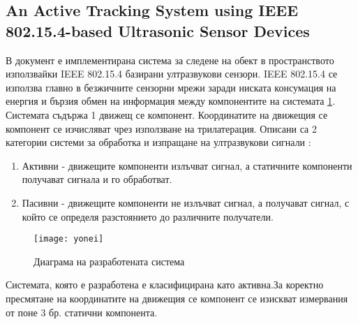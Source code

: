 \subsection{An Active Tracking System using IEEE 802.15.4-based Ultrasonic Sensor Devices}

В документ \cite{yonei} е имплементирана система за следене на обект в пространството използвайки IEEE 802.15.4 базирани ултразвукови сензори.
IEEE 802.15.4 се използва главно в безжичните сензорни мрежи заради ниската консумация на енергия и бързия обмен на информация между компонентите на системата \ref{fig:yoneiFig}. Системата съдържа 1 движещ се компонент. Координатите на движещия се компонент се изчисляват чрез използване на трилатерация.  Описани са 2 категории системи за обработка и изпращане на ултразвукови сигнали \cite{sysTypes}:

\begin{enumerate}
    \item Активни - движещите компоненти излъчват сигнал, а статичните компоненти получават сигнала и го обработват.
    \item Пасивни - движещите компоненти не излъчват сигнал, а получават сигнал, с който се определя разстоянието до различните получатели.
\end{enumerate}

\begin{figure}
    \centering
    \texttt{[image: yonei]}
    \caption{Диаграма на разработената система}
    \label{fig:yoneiFig}
\end{figure}


Системата, която е разработена е класифицирана като активна.За коректно пресмятане на координатите на движещия се компонент се изискват измервания от поне 3 бр. статични компонента.

